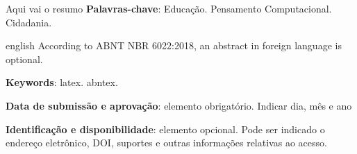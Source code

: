 \documentclass[article, 11pt, oneside, a4paper, english, brazil, sumario=tradicional]{abntex2}
\begin{document}

\frenchspacing

\maketitle
\begin{resumoumacoluna}
  Aqui vai o resumo
 \vspace{\onelineskip}
 \noindent
 \textbf{Palavras-chave}: Educação. Pensamento Computacional. Cidadania.
\end{resumoumacoluna}

\renewcommand{\resumoname}{Abstract}
\begin{resumoumacoluna}
 \begin{otherlanguage*}{english}
   According to ABNT NBR 6022:2018, an abstract in foreign language is optional.

   \vspace{\onelineskip}

   \noindent
   \textbf{Keywords}: latex. abntex.
 \end{otherlanguage*}
\end{resumoumacoluna}
\begin{center}\smaller
\textbf{Data de submissão e aprovação}: elemento obrigatório. Indicar dia, mês e ano

\textbf{Identificação e disponibilidade}: elemento opcional. Pode ser indicado
o endereço eletrônico, DOI, suportes e outras informações relativas ao acesso.
\end{center}

\newpage

\tableofcontents*
\cleardoublepage

\textual
\end{document}
